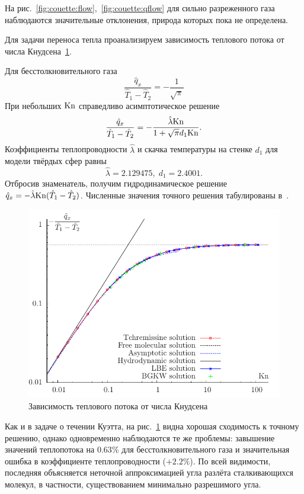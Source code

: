 На рис.~\ref{fig:couette:flow},~\ref{fig:couette:qflow} для сильно разреженного газа наблюдаются
значительные отклонения, природа которых пока не определена.

Для задачи переноса тепла проанализируем зависимость теплового потока от числа Кнудсена~\ref{fig:heat}.

Для бесстолкновительного газа
\[ \frac{\hat{q}_x}{\hat{T}_1-\hat{T}_2} = -\frac1{\sqrt{\pi}} \]
При небольших \(\mathrm{Kn}\) справедливо асимптотическое решение
\[ \frac{\hat{q}_x}{\hat{T}_1-\hat{T}_2} = -\frac{\hat{\lambda}\mathrm{Kn}}{1+\sqrt{\pi}d_1\mathrm{Kn}}. \]
Коэффициенты теплопроводности \(\hat{\lambda}\) и скачка температуры на стенке \(d_1\) для модели твёрдых сфер равны~\cite{Sone2007}
\[ \hat{\lambda} = 2.129475, \; d_1 = 2.4001. \]
Отбросив знаменатель, получим гидродинамическое решение \(\hat{q}_x = -\hat{\lambda}\mathrm{Kn}(\hat{T}_1-\hat{T}_2)\).
Численные значения точного решения табулированы в~\cite{Sone2007}.

\begin{figure}
	\centering
	\includegraphics{problems/heat_qflow.pdf}
	\caption{Зависимость теплового потока от числа Кнудсена}\label{fig:heat}
\end{figure}

Как и в задаче о течении Куэтта, на рис.~\ref{fig:heat} видна хорошая сходимость к точному решению,
однако одновременно наблюдаются те же проблемы: завышение значений теплопотока на \(0.63\)\%
для бесстолкновительного газа и значительная ошибка в коэффициенте теплопроводности (\(+2.2\%\)).
По всей видимости, последняя объясняется неточной аппроксимацией угла разлёта сталкивающихся молекул,
в частности, существованием минимально разрешимого угла.


